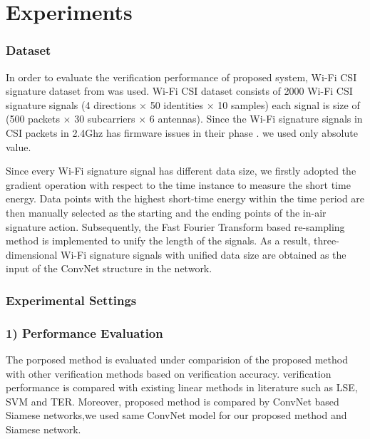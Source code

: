 \documentclass[runningheads]{llncs}
\begin{document}

\section{Experiments}

\subsubsection{Dataset}
 In order to evaluate the verification performance of proposed system, Wi-Fi CSI signature dataset from \cite{moon2017air} was used. Wi-Fi CSI dataset consists of 2000 Wi-Fi CSI signature signals (4 directions $\times$ 50 identities $\times$ 10 samples) each signal is size of (500 packets $\times$ 30 subcarriers $\times$ 6 antennas). Since the Wi-Fi signature signals in CSI packets in 2.4Ghz has firmware issues in their phase \cite{wang2015understanding}. we used only absolute value.

 Since every Wi-Fi signature signal has different data size, we firstly adopted the gradient operation with respect to the time instance to measure the short time energy. Data points with the highest short-time energy within the time period are then manually selected as the starting and the ending points of the in-air signature action. Subsequently, the Fast Fourier Transform based re-sampling method \cite{moon2017air} is implemented to unify the length of the signals. As a result, three-dimensional Wi-Fi signature signals with unified data size are obtained as the input of the ConvNet structure in the network.

\subsubsection{Experimental Settings}

\subsubsection{1) Performance Evaluation}
The porposed method is evaluated under comparision of the proposed method with other verification methods based on verification accuracy.
verification performance is compared with existing linear methods in literature such as LSE, SVM and TER. Moreover, proposed method is compared by ConvNet based Siamese networks,we used same ConvNet model for our proposed method and Siamese network.
\end{document}
